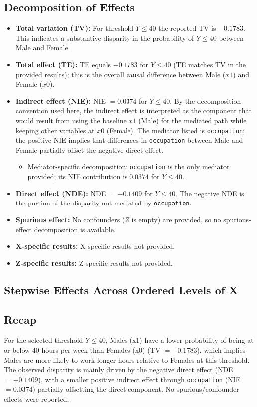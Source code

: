 \documentclass{article}
\begin{document}
\subsection*{Decomposition of Effects}
\begin{itemize}
\item \textbf{Total variation (TV):} For threshold $Y \leq 40$ the reported TV is $-0.1783$. This indicates a substantive disparity in the probability of $Y \leq 40$ between Male and Female.
\item \textbf{Total effect (TE):} TE equals $-0.1783$ for $Y \leq 40$ (TE matches TV in the provided results); this is the overall causal difference between Male ($x1$) and Female ($x0$).
\item \textbf{Indirect effect (NIE):} NIE $= 0.0374$ for $Y \leq 40$. By the decomposition convention used here, the indirect effect is interpreted as the component that would result from using the baseline $x1$ (Male) for the mediated path while keeping other variables at $x0$ (Female). The mediator listed is \texttt{occupation}; the positive NIE implies that differences in \texttt{occupation} between Male and Female partially offset the negative direct effect.
  \begin{itemize}
  \item Mediator-specific decomposition: \texttt{occupation} is the only mediator provided; its NIE contribution is $0.0374$ for $Y \leq 40$.
  \end{itemize}
\item \textbf{Direct effect (NDE):} NDE $= -0.1409$ for $Y \leq 40$. The negative NDE is the portion of the disparity not mediated by \texttt{occupation}.
\item \textbf{Spurious effect:} No confounders ($Z$ is empty) are provided, so no spurious-effect decomposition is available.
\item \textbf{X-specific results:} X-specific results not provided.
\item \textbf{Z-specific results:} Z-specific results not provided.
\end{itemize}

\subsection*{Stepwise Effects Across Ordered Levels of X}

\subsection*{Recap}
For the selected threshold $Y \leq 40$, Males (x1) have a lower probability of being at or below 40 hours-per-week than Females (x0) (TV $= -0.1783$), which implies Males are more likely to work longer hours relative to Females at this threshold. The observed disparity is mainly driven by the negative direct effect (NDE $= -0.1409$), with a smaller positive indirect effect through \texttt{occupation} (NIE $= 0.0374$) partially offsetting the direct component. No spurious/confounder effects were reported.
\end{document}
